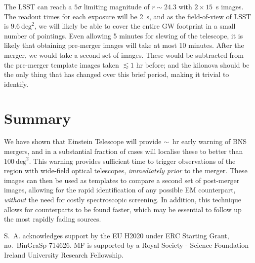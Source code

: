 \documentclass{aa}
\begin{document}
The LSST can reach a $5\sigma$ limiting magnitude of $r\sim24.3$ with $2\times15$~s images. The readout times for each exposure will be 2~s, and as the field-of-view of LSST is $9.6~\mathrm{deg}^2$, we will likely be able to cover the entire GW footprint in a small number of pointings. Even allowing 5 minutes for slewing of the telescope, it is likely that obtaining pre-merger images will take at most 10 minutes.
After the merger, we would take a second set of images. These would be subtracted from the pre-merger template images taken $\lesssim1$ hr before; and the kilonova should be the only thing that has changed over this brief period, making it trivial to identify.

\section{Summary}

We have shown that Einstein Telescope will provide $\sim$~hr early warning of BNS mergers,
and in a substantial fraction of cases will localise these to better than $100~\mathrm{deg}^2$.
This warning provides sufficient time to trigger observations of the region with wide-field
optical telescopes, {\it immediately prior} to the merger. These images can then be used as templates
to compare a second set of post-merger images, allowing for the rapid identification of any possible
EM counterpart, {\it without} the need for costly spectroscopic screening. In addition, this technique allows for 
counterparts to be found faster, which may be essential to follow up the most rapidly fading sources.



\begin{acknowledgements}
 S.~A. acknowledges support by the EU H2020 under ERC Starting Grant, no.~BinGraSp-714626.
 MF is supported by a Royal Society - Science Foundation Ireland University Research Fellowship.
\end{acknowledgements}




\end{document}
